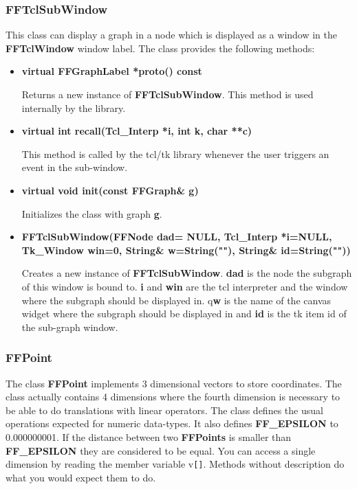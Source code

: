 \subsubsection{FFTclSubWindow}

This class can display a graph in a node which is displayed as a
window in the {\bf FFTclWindow} window label. The class provides 
the following methods:

\begin{itemize}

\item{\bf virtual FFGraphLabel *proto() const}

Returns a new instance of {\bf FFTclSubWindow}. This method is used
internally by the library.
  
\item{\bf virtual int recall(Tcl\_Interp *i, int k, char **c)}

This method is called by the tcl/tk library whenever the user triggers
an event in the sub-window.

\item{\bf virtual void init(const FFGraph\& g)}

Initializes the class with graph {\bf g}.
       
\item{\bf FFTclSubWindow(FFNode dad= NULL, Tcl\_Interp *i=NULL,
        Tk\_Window win=0, String\& w=String(""), String\&
        id=String(""))}

Creates a new instance of {\bf FFTclSubWindow}. {\bf dad} is the node
the subgraph of this window is bound to. {\bf i} and {\bf win} are the
tcl interpreter and the window where the subgraph should be displayed
in.  q{\bf w} is the name of the canvas widget where the subgraph
should be displayed in and {\bf id} is the tk item id of the sub-graph
window.

\end{itemize}

\subsubsection{FFPoint}

The class {\bf FFPoint} implements 3 dimensional vectors to store
coordinates. The class actually contains 4 dimensions where the fourth
dimension is necessary to be able to do translations with linear
operators. The class defines the usual operations expected for
numeric data-types. It also defines {\bf FF\_EPSILON} to 0.000000001. If the
distance between two {\bf FFPoints} is smaller than {\bf FF\_EPSILON} they are
considered to be equal. You can access a single dimension by reading
the member variable v\verb|[]|. Methods without description do what
you would expect them to do.

